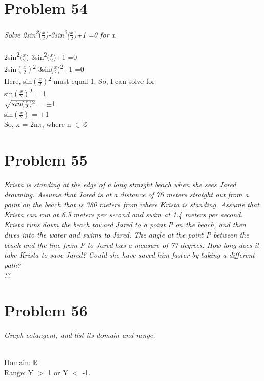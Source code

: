 \documentclass[11pt]{article} %
\begin{document}
{\section{Problem 54} 
\textit{Solve 2sin\textsuperscript{2}$(\frac{x}{2}$)-3sin\textsuperscript{2}($\frac{x}{2}$)+1 =0 for x.}
\\
\\2sin\textsuperscript{2}$(\frac{x}{2}$)-3sin\textsuperscript{2}($\frac{x}{2}$)+1 =0
\\2sin$(\frac{x}{2})$\textsuperscript{2}-3sin($\frac{x}{2}$)\textsuperscript{2}+1 =0
\\Here, sin$(\frac{x}{2})$\textsuperscript{2} must equal 1. So, I can solve for 
\\ sin$(\frac{x}{2})$\textsuperscript{2} = 1
\\ $\sqrt{sin(\frac{x}{2})\textsuperscript{2}}$ = $\pm$1
\\ sin$(\frac{x}{2})$ = $\pm$1
\\ So, x = 2n$\pi$, where n $\in \mathcal{Z}$


\section{Problem 55}
\textit{Krista is standing at the edge of a long straight beach when she sees Jared drowning. Assume that Jared is at a distance of 76 meters straight out from a point on the beach that is 380 meters from where Krista is standing. Assume that Krista can run at 6.5 meters per second and swim at 1.4 meters per second. Krista runs down the beach toward Jared to a point P on the beach, and then dives into the water and swims to Jared. The angle at the point P between the beach and the line from P to Jared has a measure of 77 degrees. How long does it take Krista to save Jared? Could she have saved him faster by taking a different path?}
\\ ??


\section{Problem 56} \textit{Graph cotangent, and list its domain and range.}
\\
\\
Domain: $\mathds{R}$
\\ Range: Y $>$ 1 or Y $<$ -1. 

}
\end{document}
